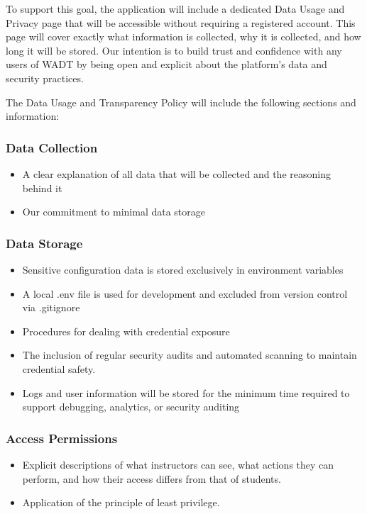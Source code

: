 \documentclass[12pt,titlepage]{article}
\begin{document}
To support this goal, the application will include a dedicated Data Usage and Privacy page that will be accessible without requiring a registered account. This page will cover exactly what information is collected, why it is collected, and how long it will be stored. Our intention is to build trust and confidence with any users of WADT by being open and explicit about the platform’s data and security practices.

The Data Usage and Transparency Policy will include the following sections and information:

\subsubsection{Data Collection}
\begin{itemize}
	\item A clear explanation of all data that will be collected and the reasoning behind it
	\item Our commitment to minimal data storage
\end{itemize}

\subsubsection{Data Storage}
\begin{itemize}
	\item Sensitive configuration data is stored exclusively in environment variables
	\item A local .env file is used for development and excluded from version control via .gitignore
	\item Procedures for dealing with credential exposure
	\item The inclusion of regular security audits and automated scanning to maintain credential safety.
	\item Logs and user information will be stored for the minimum time required to support debugging, analytics, or security auditing
\end{itemize}

\subsubsection{Access Permissions}
\begin{itemize}
	\item Explicit descriptions of what instructors can see, what actions they can perform, and how their access differs from that of students.
	\item Application of the principle of least privilege.
\end{itemize}
\end{document}
